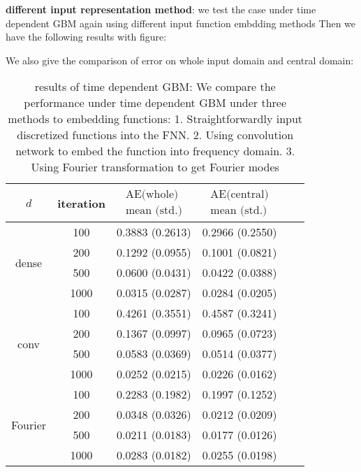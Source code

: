 \documentclass[11pt,a4paper]{article}
\theoremstyle{remark}
\begin{document}
	
	\noindent \textbf{different input representation method}: we test the case under time dependent GBM again using different input function embdding methods
	Then we have the following results with figure:
	\begin{figure}[h!]
		\centering
		\quad
		\caption{}
		\label{fig:path}
	\end{figure}
	
	We also give the comparison of error on whole input domain and central domain:
	\begin{table}[H]
		\centering
		\begin{tabular}{cccccc}
			\hline$d$ & iteration & $\begin{array}{c}\text{AE(whole)} \\
				\text{mean (std.)} \end{array}$   & $\begin{array}{c}\text{AE(central)} \\
				\text{mean (std.)} \end{array}$  \\
			\hline \multirow{4}{*}{dense} & 100 & 0.3883 (0.2613) & 0.2966 (0.2550) \\
			& 200 & 0.1292 (0.0955) & 0.1001 (0.0821) \\
			& 500 & 0.0600 (0.0431) & 0.0422 (0.0388) \\
			& 1000 & 0.0315 (0.0287) & 0.0284 (0.0205) \\                
			\hline \multirow{4}{*}{conv} & 100 & 0.4261 (0.3551) & 0.4587 (0.3241) \\
			& 200 & 0.1367 (0.0997) & 0.0965 (0.0723) \\
			& 500 & 0.0583 (0.0369) & 0.0514 (0.0377) \\
			& 1000 & 0.0252 (0.0215) & 0.0226 (0.0162) \\
			\hline \multirow{4}{*}{Fourier} & 100 & 0.2283 (0.1982) & 0.1997 (0.1252) \\
			& 200 & 0.0348 (0.0326) & 0.0212 (0.0209) \\
			& 500 & 0.0211 (0.0183) & 0.0177 (0.0126)\\
			& 1000 & 0.0283 (0.0182) & 0.0255 (0.0198) \\ 
			
			\hline
		\end{tabular}
		\caption{results of time dependent GBM: We compare the performance under time dependent GBM under three methods to embedding functions: 1. Straightforwardly input discretized functions into the FNN. 2. Using convolution network to  embed the function into frequency domain. 3. Using Fourier transformation to get Fourier modes}
		\label{tab:my_label}
	\end{table}
	
\end{document}
